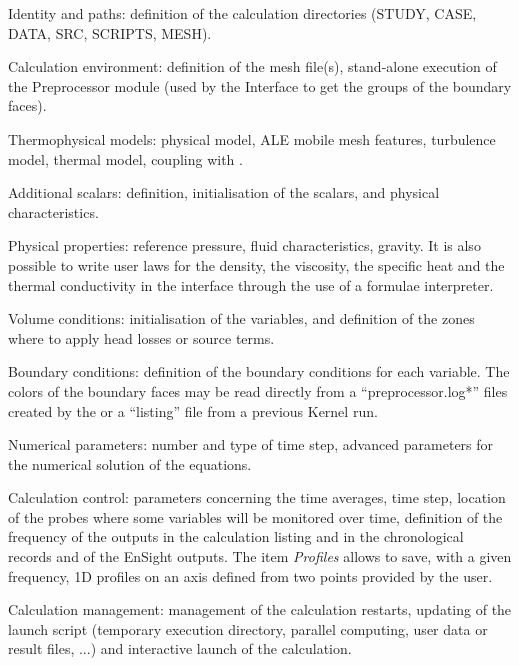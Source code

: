 {{{{\begin{list}{-}{}
\item Identity and paths: definition of the calculation directories
      (STUDY, CASE, DATA, SRC, SCRIPTS, MESH).

\item Calculation environment: definition of the mesh file(s),
      stand-alone execution of the Preprocessor module
      (used by the Interface to get the groups of the boundary
      faces).

\item Thermophysical models: physical model, ALE mobile mesh features,
      turbulence model, thermal model, coupling with \syrthes.

\item Additional scalars: definition, initialisation of the scalars,
      and physical characteristics.

\item Physical properties: reference pressure, fluid characteristics, gravity.
      It is also possible to write user laws for the density, the viscosity,
      the specific heat and the thermal conductivity in the interface through
      the use of a formulae interpreter.

\item Volume conditions: initialisation of the variables, and definition of
      the zones where to apply head losses or source terms.

\item Boundary conditions: definition of the boundary conditions for
      each variable. The colors of the boundary faces may be read
      directly from a ``preprocessor.log*'' files created by the \pcs
      or a ``listing'' file from a previous Kernel run.

\item Numerical parameters: number and type of time step, advanced parameters
      for the numerical solution of the equations.

\item Calculation control: parameters concerning the time averages, time step,
      location of
      the probes where some variables will be monitored over time,
      definition of the frequency of the outputs in the calculation
      listing and in the chronological records and of the EnSight outputs.
      The item {\itshape Profiles} allows to save, with a  given frequency,
      1D profiles on an axis defined from two points provided by the user.

\item Calculation management: management of the calculation restarts,
      updating of the launch script (temporary execution directory, parallel
      computing, user data or result files, ...) and interactive launch of the
      calculation.


\end{list}}}}}
